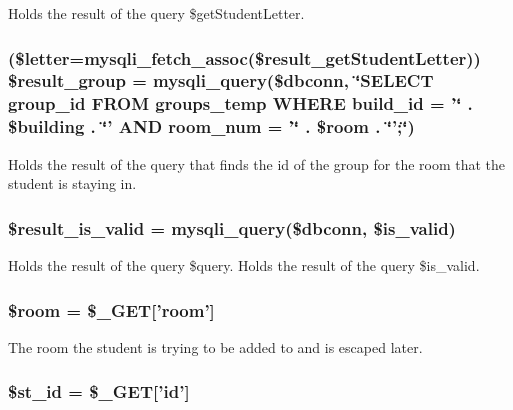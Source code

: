 \-Holds the result of the query \$get\-Student\-Letter. \hypertarget{updateStudentTableDB_8php_a7ac58462dd2e6879a3f08e42f20adc8a}{
\subsubsection[{\$result\-\_\-group}]{ (\$letter=mysqli\-\_\-fetch\-\_\-assoc(\$result\-\_\-get\-Student\-Letter)) \$result\-\_\-group = mysqli\-\_\-query(\$dbconn, \char`\"{}\-S\-E\-L\-E\-C\-T group\-\_\-id \-F\-R\-O\-M groups\-\_\-temp \-W\-H\-E\-R\-E build\-\_\-id = '\char`\"{} . \$building . \char`\"{}' \-A\-N\-D room\-\_\-num = '\char`\"{} . \$room . \char`\"{}';\char`\"{})}}\label{updateStudentTableDB_8php_a7ac58462dd2e6879a3f08e42f20adc8a}
\-Holds the result of the query that finds the id of the group for the room that the student is staying in. \hypertarget{updateStudentTableDB_8php_a93add9cb1d213b0fdb7c51b0464785d3}{
\subsubsection[{\$result\-\_\-is\-\_\-valid}]{\setlength{\rightskip}{0pt plus 5cm}\$result\-\_\-is\-\_\-valid = mysqli\-\_\-query(\$dbconn, \$is\-\_\-valid)}}\label{updateStudentTableDB_8php_a93add9cb1d213b0fdb7c51b0464785d3}
\-Holds the result of the query \$query. \-Holds the result of the query \$is\-\_\-valid. \hypertarget{updateStudentTableDB_8php_ab285a2e759ea45a70f8ff40a63d2fe89}{
\subsubsection[{\$room}]{\setlength{\rightskip}{0pt plus 5cm}\$room = \$\-\_\-\-G\-E\-T\mbox{[}'room'\mbox{]}}}\label{updateStudentTableDB_8php_ab285a2e759ea45a70f8ff40a63d2fe89}
\-The room the student is trying to be added to and is escaped later. \hypertarget{updateStudentTableDB_8php_ab68b86e23fd74e101c03130a49b24f66}{
\subsubsection[{\$st\-\_\-id}]{\setlength{\rightskip}{0pt plus 5cm}\$st\-\_\-id = \$\-\_\-\-G\-E\-T\mbox{[}'id'\mbox{]}}}\label{updateStudentTableDB_8php_ab68b86e23fd74e101c03130a49b24f66}
